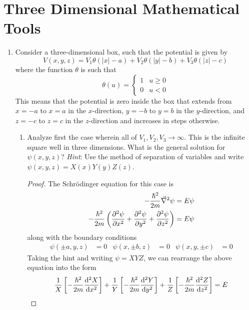 \documentclass[../psets.tex]{subfiles}
\begin{document}
\section{Three Dimensional Mathematical Tools}
\begin{enumerate}
    \item {}Consider a three-dimensional box, such that the potential is given by
    \begin{equation}
        V(x,y,z) = V_1\theta(|x|-a)+V_2\theta(|y|-b)+V_3\theta(|z|-c)
    \end{equation}
    where the function $\theta$ is such that
    \begin{equation}
        \theta(u) =
        \begin{cases}
            1 & u\geq 0\\
            0 & u<0
        \end{cases}
    \end{equation}
    This means that the potential is zero inside the box that extends from $x=-a$ to $x=a$ in the $x$-direction, $y=-b$ to $y=b$ in the $y$-direction, and $z=-c$ to $z=c$ in the $z$-direction and increases in steps otherwise.
    \begin{enumerate}
        \item Analyze first the case wherein all of $V_1,V_2,V_3\to\infty$. This is the infinite square well in three dimensions. What is the general solution for $\psi(x,y,z)$? \emph{Hint}: Use the method of separation of variables and write $\psi(x,y,z)=X(x)Y(y)Z(z)$.
        \begin{proof}
            The Schr\"{o}dinger equation for this case is
            \begin{align*}
                -\frac{\hbar^2}{2m}\vec{\nabla}^2\psi &= E\psi\\
                -\frac{\hbar^2}{2m}\left( \pdv[2]{\psi}{x}+\pdv[2]{\psi}{y}+\pdv[2]{\psi}{z} \right) &= E\psi
            \end{align*}
            along with the boundary conditions
            \begin{align*}
                \psi(\pm a,y,z) &= 0&
                \psi(x,\pm b,z) &= 0&
                \psi(x,y,\pm c) &= 0
            \end{align*}
            Taking the hint and writing $\psi=XYZ$, we can rearrange the above equation into the form
            \begin{equation*}
                \frac{1}{X}\left[ -\frac{\hbar^2}{2m}\dv[2]{X}{x} \right]+\frac{1}{Y}\left[ -\frac{\hbar^2}{2m}\dv[2]{Y}{y} \right]+\frac{1}{Z}\left[ -\frac{\hbar^2}{2m}\dv[2]{Z}{z} \right] = E

\end{equation*}
\end{proof}
\end{enumerate}
\end{enumerate}
\end{document}
